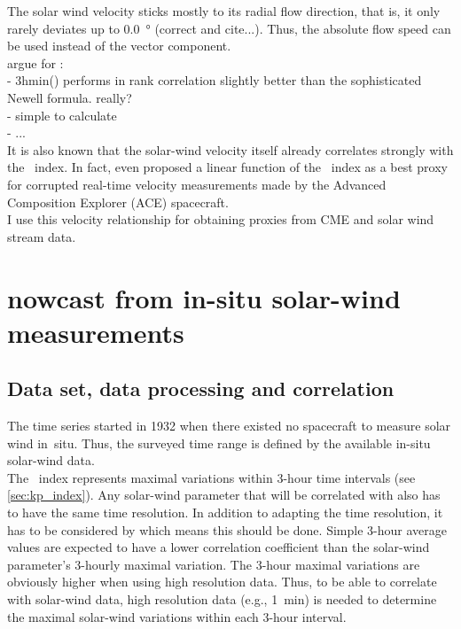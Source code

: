 The solar wind velocity sticks mostly to its radial flow direction, that is, it only rarely deviates up to \SI{0.0}{\degree} (correct and cite...). Thus, the absolute flow speed can be used instead of the vector component.\\

argue for \vBz:\\
- 3hmin(\vBz) performs in rank correlation slightly better than the sophisticated Newell formula. really?\\
- simple to calculate\\
- ...\\

It is also known that the solar-wind velocity itself already correlates strongly with the \Kp~index. In fact, \citet{Machol2013} even proposed a linear function of the \Kp~index as a best proxy for corrupted real-time velocity measurements made by the Advanced Composition Explorer (ACE) spacecraft.\\

I use this velocity relationship for obtaining \Kp{} proxies from CME and solar wind stream data.\\


\section{\Kp{} nowcast from in-situ solar-wind measurements}
\label{sec:kp_nowcast}

\subsection{Data set, data processing and correlation}
\label{sec:data_set__data_processing_and_correlation}
The \Kp{} time series started in 1932 when there existed no spacecraft to measure solar wind in~situ. Thus, the surveyed time range is defined by the available in-situ solar-wind data.\\

The \Kp{}~index represents maximal variations within 3-hour time intervals (see \autoref{sec:kp_index}). Any solar-wind parameter that will be correlated with \Kp{} also has to have the same time resolution. In addition to adapting the time resolution, it has to be considered by which means this should be done. Simple 3-hour average values are expected to have a lower correlation coefficient than the solar-wind parameter's 3-hourly maximal variation.
The 3-hour maximal variations are obviously higher when using high resolution data. Thus, to be able to correlate \Kp{} with solar-wind data, high resolution data (e.g., 1~min) is needed to determine the maximal solar-wind variations within each 3-hour interval.\\

